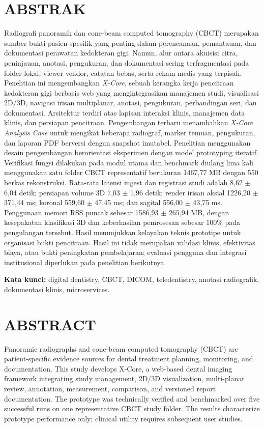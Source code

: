 \documentclass[12pt,a4paper,oneside]{report}
\newcommand{\xcore}{\textit{X-Core}}
\begin{document}
\chapter*{ABSTRAK}
Radiografi panoramik dan cone-beam computed tomography (CBCT) merupakan sumber bukti pasien-spesifik yang penting dalam perencanaan, pemantauan, dan dokumentasi perawatan kedokteran gigi. Namun, alur antara akuisisi citra, peninjauan, anotasi, pengukuran, dan dokumentasi sering terfragmentasi pada folder lokal, viewer vendor, catatan bebas, serta rekam medis yang terpisah. Penelitian ini mengembangkan \xcore{}, sebuah kerangka kerja pencitraan kedokteran gigi berbasis web yang mengintegrasikan manajemen studi, visualisasi 2D/3D, navigasi irisan multiplanar, anotasi, pengukuran, perbandingan seri, dan dokumentasi. Arsitektur terdiri atas lapisan interaksi klinis, manajemen data klinis, dan persiapan pencitraan. Pengembangan terbaru menambahkan \textit{X-Core Analysis Case} untuk mengikat beberapa radiograf, marker temuan, pengukuran, dan laporan PDF berversi dengan snapshot imutabel. Penelitian menggunakan desain pengembangan berorientasi eksperimen dengan model prototyping iteratif. Verifikasi fungsi dilakukan pada modul utama dan benchmark diulang lima kali menggunakan satu folder CBCT representatif berukuran 1467,77 MB dengan 550 berkas rekonstruksi. Rata-rata latensi ingest dan registrasi studi adalah 8,62 $\pm$ 6,04 detik; persiapan volume 3D 7,03 $\pm$ 1,96 detik; render irisan aksial 1226,20 $\pm$ 371,44 ms; koronal 559,60 $\pm$ 47,45 ms; dan sagital 556,00 $\pm$ 43,75 ms. Penggunaan memori RSS puncak sebesar 1586,93 $\pm$ 265,94 MB, dengan kesepakatan klasifikasi 3D dan keberhasilan pemrosesan sebesar 100\% pada pengulangan tersebut. Hasil menunjukkan kelayakan teknis prototipe untuk organisasi bukti pencitraan. Hasil ini tidak merupakan validasi klinis, efektivitas biaya, atau bukti peningkatan pembelajaran; evaluasi pengguna dan integrasi institusional diperlukan pada penelitian berikutnya.

\noindent\textbf{Kata kunci:} digital dentistry, CBCT, DICOM, teledentistry, anotasi radiografik, dokumentasi klinis, microservices.

\chapter*{ABSTRACT}
Panoramic radiographs and cone-beam computed tomography (CBCT) are patient-specific evidence sources for dental treatment planning, monitoring, and documentation. This study develops X-Core, a web-based dental imaging framework integrating study management, 2D/3D visualization, multi-planar review, annotation, measurement, comparison, and versioned report documentation. The prototype was technically verified and benchmarked over five successful runs on one representative CBCT study folder. The results characterize prototype performance only; clinical utility requires subsequent user studies.
\end{document}
